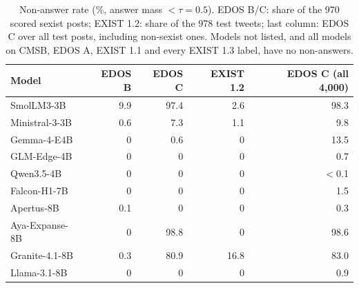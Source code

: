 \begin{table}[t]
\centering
\small
\caption{Non-answer rate (\%, answer mass $<\tau=0.5$). EDOS B/C: share of the 970 scored sexist posts; EXIST 1.2: share of the 978 test tweets; last column: EDOS C over all test posts, including non-sexist ones. Models not listed, and all models on CMSB, EDOS A, EXIST 1.1 and every EXIST 1.3 label, have no non-answers.}
\label{tab:refusal}
\begin{tabular}{lrrrr}
\toprule
Model & EDOS B & EDOS C & EXIST 1.2 & EDOS C (all 4{,}000) \\
\midrule
SmolLM3-3B & 9.9 & 97.4 & 2.6 & 98.3 \\
Ministral-3-3B & 0.6 & 7.3 & 1.1 & 9.8 \\
Gemma-4-E4B & 0 & 0.6 & 0 & 13.5 \\
GLM-Edge-4B & 0 & 0 & 0 & 0.7 \\
Qwen3.5-4B & 0 & 0 & 0 & $<$0.1 \\
Falcon-H1-7B & 0 & 0 & 0 & 1.5 \\
Apertus-8B & 0.1 & 0 & 0 & 0.3 \\
Aya-Expanse-8B & 0 & 98.8 & 0 & 98.6 \\
Granite-4.1-8B & 0.3 & 80.9 & 16.8 & 83.0 \\
Llama-3.1-8B & 0 & 0 & 0 & 0.9 \\
\bottomrule
\end{tabular}
\end{table}
